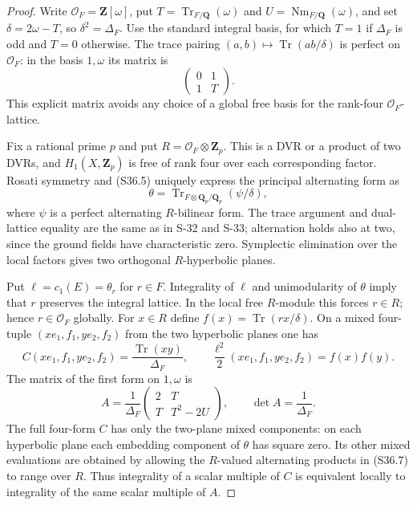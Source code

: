 \begin{proof}
Write $\mathcal O_F=\mathbf Z[\omega]$, put
$T=\operatorname{Tr}_{F/\mathbf Q}(\omega)$ and
$U=\operatorname{Nm}_{F/\mathbf Q}(\omega)$, and set
$\delta=2\omega-T$, so $\delta^2=\Delta_F$.
Use the standard integral basis, for which $T=1$ if
$\Delta_F$ is odd and $T=0$ otherwise.
The trace pairing $(a,b)\mapsto\operatorname{Tr}(ab/\delta)$
is perfect on $\mathcal O_F$: in the basis $1,\omega$
its matrix is
\[
 \begin{pmatrix}0&1\\1&T\end{pmatrix}.
 \tag{S36.5}
\]
This explicit matrix avoids any choice of a global free
basis for the rank-four $\mathcal O_F$-lattice.

Fix a rational prime $p$ and put
$R=\mathcal O_F\otimes\mathbf Z_p$.
This is a DVR or a product of two DVRs, and
$H_1(X,\mathbf Z_p)$ is free of rank four over each
corresponding factor. Rosati symmetry and (S36.5)
uniquely express the principal alternating form as
\[
 \theta=\operatorname{Tr}_{F\otimes\mathbf Q_p/\mathbf Q_p}
                       (\psi/\delta),
 \tag{S36.6}
\]
where $\psi$ is a perfect alternating $R$-bilinear form.
The trace argument and dual-lattice equality are the
same as in S-32 and S-33; alternation holds also at two,
since the ground fields have characteristic zero.
Symplectic elimination over the local factors gives
two orthogonal $R$-hyperbolic planes.

Put $\ell=c_1(E)=\theta_r$ for $r\in F$.
Integrality of $\ell$ and unimodularity of $\theta$
imply that $r$ preserves the integral lattice. In the
local free $R$-module this forces $r\in R$; hence
$r\in\mathcal O_F$ globally.
For $x\in R$ define $f(x)=\operatorname{Tr}(rx/\delta)$.
On a mixed four-tuple $(xe_1,f_1,ye_2,f_2)$ from the
two hyperbolic planes one has
\[
 C(xe_1,f_1,ye_2,f_2)=\frac{\operatorname{Tr}(xy)}{\Delta_F},
 \qquad
 \frac{\ell^2}{2}(xe_1,f_1,ye_2,f_2)=f(x)f(y).
 \tag{S36.7}
\]
The matrix of the first form on $1,\omega$ is
\[
 A=\frac1{\Delta_F}
       \begin{pmatrix}2&T\\T&T^2-2U\end{pmatrix},
 \qquad \det A=\frac1{\Delta_F}.
 \tag{S36.8}
\]
The full four-form $C$ has only the two-plane mixed
components: on each hyperbolic plane each embedding
component of $\theta$ has square zero. Its other
mixed evaluations are obtained by allowing the
$R$-valued alternating products in (S36.7) to range
over $R$. Thus integrality of a scalar multiple of
$C$ is equivalent locally to integrality of the same
scalar multiple of $A$.


\end{proof}
